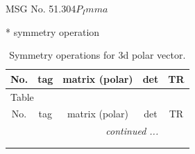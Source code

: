\documentclass[fleqn,8pt]{jsarticle}
\begin{document}
\setcounter{MaxMatrixCols}{32}

\renewcommand{\tablename}{Table~}
\renewcommand{\figurename}{Figure~}
\begin{center}
\LARGE
MSG No. 51.304\quad$P_{I}mma$
\end{center}
* symmetry operation
\renewcommand{\arraystretch}{1.3}
\begin{longtable}{ccccc}
\caption{Symmetry operations for 3d polar vector.}
 \\
 \hline \hline
No. & tag & matrix (polar) & det & TR \\ \hline \endfirsthead

\multicolumn{4}{l}{\tablename\ \thetable{}} \\
 \hline \hline
No. & tag & matrix (polar) & det & TR \\ \hline \endhead

 \hline \hline
\multicolumn{4}{r}{\footnotesize\it continued ...} \\ \endfoot

 \hline \hline
\multicolumn{4}{r}{} \\ \endlastfoot


\end{longtable}
\end{document}
